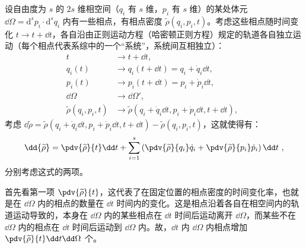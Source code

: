 设自由度为 $s$ 的 $2s$ 维相空间（$q_i$ 有 $s$ 维，$p_i$ 有 $s$ 维）的某处体元 $\dd \Omega = \mathrm{d}^{s}{p_i} \cdot  \mathrm{d}^{s}{q_i}$ 内有一些相点，有相点密度 $\widetilde \rho(q_i, p_i, t)$。考虑这些相点随时间变化 $t \rightarrow t + \dd t$，各自沿由正则运动方程（哈密顿正则方程）规定的轨道各自独立运动（每个相点代表系综中的一个“系统”，系统间互相独立）：
$$
\begin{aligned}
t                            &\rightarrow t+\dd t, \\
q_i(t)                       &\rightarrow q_i(t+\dd t) = q_i + \dot q_i \dd t, \\
p_i(t)                       &\rightarrow p_i(t+\dd t) = p_i + \dot p_i \dd t, \\
\dd \Omega                   &\rightarrow \dd \Omega', \\
\widetilde \rho(q_i, p_i, t) &\rightarrow \widetilde \rho(q_i + \dot q_i \dd t, p_i + \dot p_i \dd t, t + \dd t),
\end{aligned}~~
$$
考虑 $\dd{\widetilde{\rho}} = \widetilde{\rho}(q_i + \dot q_i \dd t, p_i + \dot p_i \dd t, t + \dd t) - \widetilde{\rho}(q_i, p_i, t)$，这就使得有：
\begin{equation}\label{eq_LiouTh_3}
\dd{\widetilde \rho} = \pdv{\widetilde \rho}{t} \dd t + \sum_{i=1}^{s}\left(\pdv{\widetilde \rho}{q_i}\dot q_i + \pdv{\widetilde \rho}{p_i}\dot p_i\right) \dd t  ~,
\end{equation}
分别考虑这式的两项。

首先看第一项 $\pdv{\widetilde \rho}{t}$，这代表了在固定位置的相点密度的时间变化率，也就是在 $\dd \Omega$ 内的相点的数量在 $\dd t$ 时间内的变化。这是相点沿着各自在相空间内的轨道运动导致的，本身在 $\dd \Omega$ 内的某些相点在 $\dd t$ 时间后运动离开 $\dd \Omega$，而某些不在 $\dd \Omega$ 内的相点在 $\dd t$ 时间后运动到 $\dd \Omega$ 内。故，$\dd t$ 内 $\dd \Omega$ 内相点增加 $\pdv{\widetilde \rho}{t} \dd t \dd \Omega$ 个。

